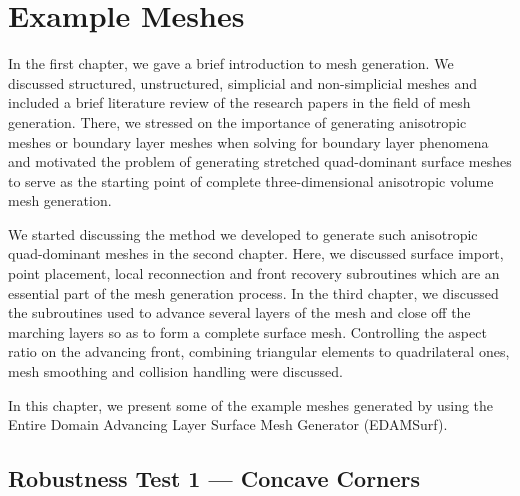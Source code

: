 \chapter{Example Meshes}

In the first chapter, we gave a brief introduction to mesh generation. We discussed structured, unstructured, simplicial and non-simplicial meshes and included a brief literature review of the research papers in the field of mesh generation. There, we stressed on the importance of generating anisotropic meshes or boundary layer meshes when solving for boundary layer phenomena and motivated the problem of generating stretched quad-dominant surface meshes to serve as the starting point of complete three-dimensional anisotropic volume mesh generation.

We started discussing the method we developed to generate such anisotropic quad-dominant meshes in the second chapter. Here, we discussed surface import, point placement, local reconnection and front recovery subroutines which are an essential part of the mesh generation process. In the third chapter, we discussed the subroutines used to advance several layers of the mesh and close off the marching layers so as to form a complete surface mesh. Controlling the aspect ratio on the advancing front, combining triangular elements to quadrilateral ones, mesh smoothing and collision handling were discussed.

In this chapter, we present some of the example meshes generated by using the Entire Domain Advancing Layer Surface Mesh Generator (EDAMSurf).


\section{Robustness Test 1 --- Concave Corners}

